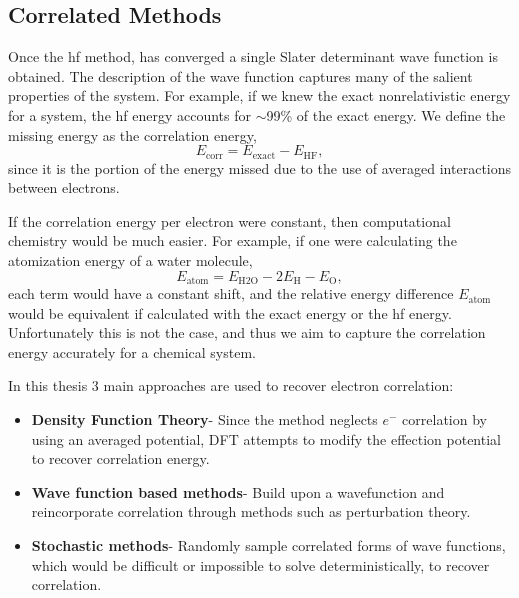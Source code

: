 \subsection{Correlated Methods}
Once the \gls{hf} method, has converged a single Slater determinant wave function is obtained.
The description of the wave function captures many of the salient properties of the system.
For example, if we knew the exact nonrelativistic energy for a system, the \gls{hf} energy accounts for $\sim$99\% of the exact energy.
We define the missing energy as the correlation energy,
\begin{equation}
E_{\mathrm{corr}} = E_{\mathrm{exact}} - E_{\mathrm{HF}},
\end{equation}
since it is the portion of the energy missed due to the use of averaged interactions between electrons.

If the correlation energy per electron were constant, then computational chemistry would be much easier.
For example, if one were calculating the atomization energy of a water molecule,
\begin{equation}
    E_{\mathrm{atom}} = E_{\mathrm{H2O}} - 2 E_{\mathrm{H}} - E_{\mathrm{O}},
\end{equation}
each term would have a constant shift, and the relative energy difference $E_{\mathrm{atom}}$ would be equivalent if calculated with the exact energy or the \gls{hf} energy.
Unfortunately this is not the case, and thus we aim to capture the correlation energy accurately for a chemical system.

In this thesis 3 main approaches are used to recover electron correlation:
\begin{itemize}
    \item \textbf{Density Function Theory}- Since the  method neglects $e^{-}$ correlation by using an averaged potential, DFT attempts to modify the effection potential to recover correlation energy.
    \item \textbf{Wave function based methods}- Build upon a  wavefunction and reincorporate correlation through methods such as perturbation theory.
\item \textbf{Stochastic methods}- Randomly sample correlated forms of wave functions, which would be difficult or impossible to solve deterministically, to recover correlation.
\end{itemize}
